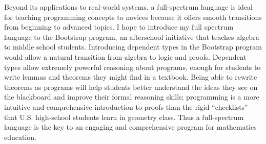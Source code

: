 \documentclass[12pt]{article}
\begin{document}
Beyond its applications to real-world systems, a full-spectrum language is ideal for teaching programming concepts to novices because it offers smooth transitions from beginning to advanced topics.
I hope to introduce my full spectrum language to the Bootstrap program, an afterschool initiative that teaches algebra to middle school students.
Introducing dependent types in the Bootstrap program would allow a natural transition from algebra to logic and proofs.
Dependent types allow extremely powerful reasoning about programs, enough for students to write lemmas and theorems they might find in a textbook.
Being able to rewrite theorems as programs will help students better understand the ideas they see on the blackboard and improve their formal reasoning skills; programming is a more intuitive and comprehensive introduction to proofs than the rigid ``checklists'' that U.S. high-school students learn in geometry class.
Thus a full-spectrum language is the key to an engaging and comprehensive program for mathematics education.

\vfill{}
\renewcommand{\section}[2]{}
\begin{multicols}{2}
\footnotesize


\end{multicols}
\end{document}
